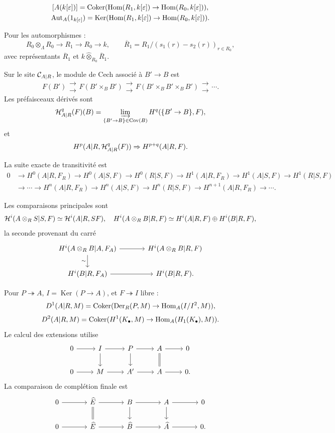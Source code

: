 \documentclass[11pt]{article}
\providecommand{\Aut}{\operatorname{Aut}}
\providecommand{\Ker}{\operatorname{Ker}}
\providecommand{\Hom}{\operatorname{Hom}}
\begin{document}
\[
\begin{gathered}
[A(k[\varepsilon])] = \Coker(\Hom(R_1,k[\varepsilon])\to\Hom(R_0,k[\varepsilon])),\\
\Aut_A(1_{k[\varepsilon]})=
\Ker(\Hom(R_1,k[\varepsilon])\to\Hom(R_0,k[\varepsilon])).
\end{gathered}
\]

Pour les automorphismes :
\[
R_0\otimes_\Lambda R_0\to R_1\to R_0\to k,
\qquad
\overline R_1=R_1/(s_1(r)-s_2(r))_{r\in R_0},
\]
avec représentants \(\overline R_1\) et \(k\widehat\otimes_{R_0}\overline R_1\).

Sur le site \(\mathcal C_{A|R}\), le module de Cech associé à \(B'\to B\) est
\[
F(B')\mathrel{\substack{\longrightarrow\\[-.6ex]\longrightarrow}} F(B'\times_BB')\mathrel{\substack{\longrightarrow\\[-.6ex]\longrightarrow}}
F(B'\times_BB'\times_BB')\mathrel{\substack{\longrightarrow\\[-.6ex]\longrightarrow}}\cdots .
\]
Les préfaisceaux dérivés sont
\[
\mathcal H^q_{A|R}(F)(B)=\varinjlim_{\{B'\to B\}\in \operatorname{Cov}(B)}H^q(\{B'\to B\},F),
\]
et
\[
H^p(A|R,\mathcal H^q_{A|R}(F))\Rightarrow H^{p+q}(A|R,F).
\]

La suite exacte de transitivité est
\[
\begin{aligned}
0&\to H^0(A|R,F_R)\to H^0(A|S,F)\to H^0(R|S,F)\to H^1(A|R,F_R)\to H^1(A|S,F)\to H^1(R|S,F)\\
&\to\cdots\to H^n(A|R,F_R)\to H^n(A|S,F)\to H^n(R|S,F)\to H^{n+1}(A|R,F_R)\to\cdots .
\end{aligned}
\]

Les comparaisons principales sont
\[
\mathcal H^i(A\otimes_RS|S,F)\simeq\mathcal H^i(A|R,SF),
\quad
H^i(A\otimes_RB|R,F)\simeq H^i(A|R,F)\oplus H^i(B|R,F),
\]
la seconde provenant du carré
\[
\begin{tikzcd}[column sep=large]
H^i(A\otimes_RB|A,F_A) \arrow[r] \arrow[d,"\sim"'] & H^i(A\otimes_RB|R,F) \\
H^i(B|R,F_A) \arrow[r] & H^i(B|R,F).
\end{tikzcd}
\]

Pour \(P\twoheadrightarrow A\), \(I=\Ker(P\to A)\), et \(F\twoheadrightarrow I\) libre :
\[
D^1(A|R,M)=\Coker(\Der_R(P,M)\to\Hom_A(I/I^2,M)),
\]
\[
D^2(A|R,M)=\Coker(H^1(K_\bullet,M)\to\Hom_A(H_1(K_\bullet),M)).
\]
Le calcul des extensions utilise
\[
\begin{tikzcd}
0\arrow[r]&I\arrow[r]\arrow[d]&P\arrow[r]\arrow[d]&A\arrow[r]\arrow[d,equal]&0\\
0\arrow[r]&M\arrow[r]&A'\arrow[r]&A\arrow[r]&0.
\end{tikzcd}
\]
La comparaison de complétion finale est
\[
\begin{tikzcd}[column sep=large]
0\arrow[r]&\Ehat\arrow[r]\arrow[d,equal]&B\arrow[r]\arrow[d]&A\arrow[r]\arrow[d]&0\\
0\arrow[r]&\Ehat\arrow[r]&\Bhat\arrow[r]&\Ahat\arrow[r]&0.
\end{tikzcd}
\]
\end{document}
